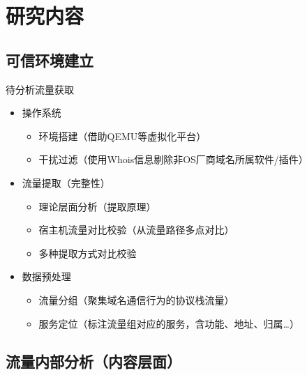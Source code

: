 \section{研究内容}
 
\subsection{可信环境建立}

\begin{frame}{待分析流量获取}
    \begin{itemize}[<+->]
        \item 操作系统
        \begin{itemize}[<+->]
            \item 环境搭建（借助QEMU等\alert{虚拟化}平台）
            \item 干扰过滤（使用\alert{Whois}信息剔除非OS厂商域名所属软件/插件）
        \end{itemize}
        \item 流量提取（\alert{完整性}）
        \begin{itemize}[<+->]
            \item 理论层面分析（提取\alert{原理}）
            \item 宿主机流量对比校验（从流量\alert{路径}多点对比）
            \item 多种\alert{提取方式}对比校验
        \end{itemize}
        \item 数据预处理
        \begin{itemize}[<+->]
            \item 流量分组（聚集域名通信行为的协议栈流量）
            \item 服务定位（\alert{标注}流量组对应的服务，含功能、地址、归属\ldots）
        \end{itemize}
    \end{itemize}
\end{frame}

\subsection{流量内部分析（内容层面）}

